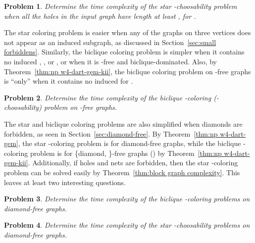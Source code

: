 \documentclass[a4paper, 11pt, oneside]{article}
\newtheorem{openproblem}{Problem}
\begin{document}
\begin{openproblem}
 Determine the time complexity of the star -choosability problem when all the holes in the input graph have length at least , for .
\end{openproblem}

The star coloring problem is easier when any of the graphs on three vertices does not appear as an induced subgraph, as discussed in Section~\ref{sec:small forbiddens}.  Similarly, the biclique coloring problem is simpler when it contains no induced , , or , or when it is -free and biclique-dominated.  Also, by Theorem~\ref{thm:np w4-dart-gem-kii}, the biclique coloring problem on -free graphs is ``only'' \NP when it contains no induced  for .  

\begin{openproblem}
 Determine the time complexity of the biclique -coloring (-choosability) problem on -free graphs.
\end{openproblem}

The star and biclique coloring problems are also simplified when diamonds are forbidden, as seen in Section~\ref{sec:diamond-free}.  By Theorem~\ref{thm:np w4-dart-gem}, the star -coloring problem is \NP for diamond-free graphs, while the biclique -coloring problem is \NP for \{diamond, \}-free graphs () by Theorem~\ref{thm:np w4-dart-gem-kii}.  Additionally, if holes and nets are forbidden, then the star -coloring problem can be solved easily by Theorem~\ref{thm:block graph complexity}.  This leaves at least two interesting questions.

\begin{openproblem}
 Determine the time complexity of the biclique -coloring problems on diamond-free graphs.
\end{openproblem}

\begin{openproblem}
 Determine the time complexity of the star -choosability problems on diamond-free graphs.
\end{openproblem}
\end{document}
